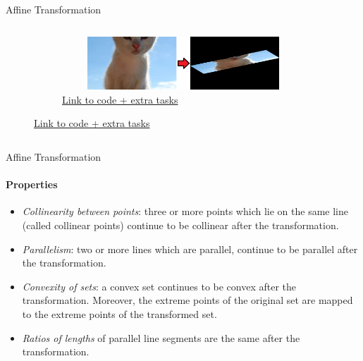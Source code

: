 \documentclass[aspectratio=169]{beamer}
\begin{document}
\begin{frame}[t]{Affine Transformation}
\begin{columns}[T,onlytextwidth]
\begin{column}{0.49\textwidth}
\begin{figure}[H]
            \begin{subfigure}{0.99\textwidth}
                \centering\includegraphics[height=2cm,width=1\textwidth,keepaspectratio]{11.png}
                \caption*{\href{https://colab.research.google.com/drive/14FE5M731bCcEWf1tpvjB9Kg4Mcu--81A?usp=sharing}{Link to code + extra tasks}}
            \end{subfigure}
        \end{figure}
    \end{column}
\end{columns}

\end{frame}

\begin{frame}[t]{Affine Transformation}
    \framesubtitle{Properties}
        \begin{itemize}
            \item \textit{Collinearity between points}: three or more points which lie on the same line (called collinear points) continue to be collinear after the transformation.
            \item \textit{Parallelism}: two or more lines which are parallel, continue to be parallel after the transformation.
            \item \textit{Convexity of sets}: a convex set continues to be convex after the transformation. Moreover, the extreme points of the original set are mapped to the extreme points of the transformed set.
            \item \textit{Ratios of lengths} of parallel line segments are the same after the transformation.
        \end{itemize}
    \end{frame}
\end{document}
